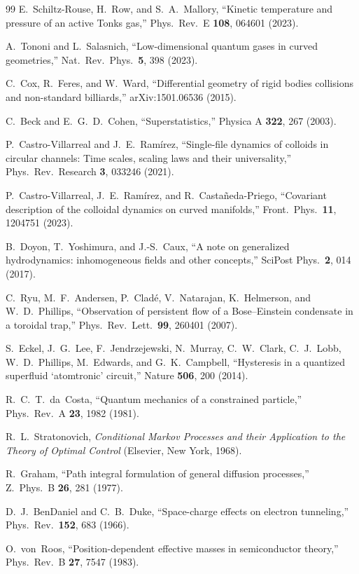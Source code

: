 \documentclass[aps,pre,twocolumn,superscriptaddress,longbibliography,floatfix]{revtex4-2}
\begin{document}
\begin{thebibliography}{99}
E.~Schiltz-Rouse, H.~Row, and S.~A.~Mallory,
``Kinetic temperature and pressure of an active Tonks gas,''
Phys.\ Rev.\ E \textbf{108}, 064601 (2023).

A.~Tononi and L.~Salasnich,
``Low-dimensional quantum gases in curved geometries,''
Nat.\ Rev.\ Phys.\ \textbf{5}, 398 (2023).

C.~Cox, R.~Feres, and W.~Ward,
``Differential geometry of rigid bodies collisions and non-standard billiards,''
arXiv:1501.06536 (2015).

C.~Beck and E.~G.~D.~Cohen,
``Superstatistics,''
Physica A \textbf{322}, 267 (2003).

P.~Castro-Villarreal and J.~E.~Ram\'irez,
``Single-file dynamics of colloids in circular channels: Time scales, scaling laws and their universality,''
Phys.\ Rev.\ Research \textbf{3}, 033246 (2021).

P.~Castro-Villarreal, J.~E.~Ram\'irez, and R.~Casta\~neda-Priego,
``Covariant description of the colloidal dynamics on curved manifolds,''
Front.\ Phys.\ \textbf{11}, 1204751 (2023).

B.~Doyon, T.~Yoshimura, and J.-S.~Caux,
``A note on generalized hydrodynamics: inhomogeneous fields and other concepts,''
SciPost Phys.\ \textbf{2}, 014 (2017).

C.~Ryu, M.~F.~Andersen, P.~Clad\'e, V.~Natarajan, K.~Helmerson, and W.~D.~Phillips,
``Observation of persistent flow of a Bose--Einstein condensate in a toroidal trap,''
Phys.\ Rev.\ Lett.\ \textbf{99}, 260401 (2007).

S.~Eckel, J.~G.~Lee, F.~Jendrzejewski, N.~Murray, C.~W.~Clark, C.~J.~Lobb, W.~D.~Phillips, M.~Edwards, and G.~K.~Campbell,
``Hysteresis in a quantized superfluid `atomtronic' circuit,''
Nature \textbf{506}, 200 (2014).

R.~C.~T.~da~Costa,
``Quantum mechanics of a constrained particle,''
Phys.\ Rev.\ A \textbf{23}, 1982 (1981).

R.~L.~Stratonovich,
\emph{Conditional Markov Processes and their Application to the Theory of Optimal Control}
(Elsevier, New York, 1968).

R.~Graham,
``Path integral formulation of general diffusion processes,''
Z.\ Phys.\ B \textbf{26}, 281 (1977).

D.~J.~BenDaniel and C.~B.~Duke,
``Space-charge effects on electron tunneling,''
Phys.\ Rev.\ \textbf{152}, 683 (1966).

O.~von~Roos,
``Position-dependent effective masses in semiconductor theory,''
Phys.\ Rev.\ B \textbf{27}, 7547 (1983).


\end{thebibliography}
\end{document}
